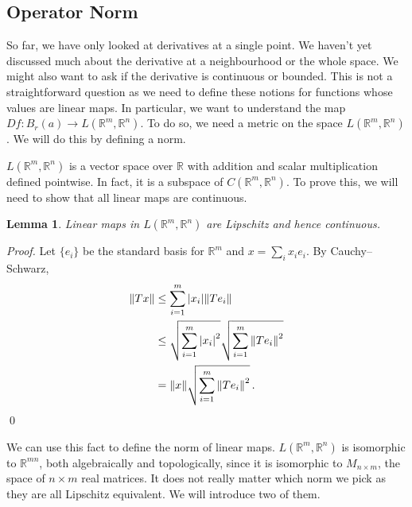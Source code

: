 \documentclass{article}
\theoremstyle{plain}\theoremheaderfont{\normalfont\itshape}\theorembodyfont{\rmfamily}\theoremseparator{.}\newtheorem*{rem}{Remark}\newtheorem*{ex}{Example}\newtheorem*{proof}{Proof}\newtheorem*{altp}{Alternative proof}
\theoremstyle{plain}\theoremheaderfont{\normalfont\bfseries}\theorembodyfont{\rmfamily}\theoremseparator{.}\newtheorem{thm}{Theorem}[section]\newtheorem{lem}[thm]{Lemma}\newtheorem{prop}[thm]{Proposition}\newtheorem*{cor}{Corollary}\newtheorem{defn}[thm]{Definition}\newtheorem{clm}[thm]{Claim}\newtheorem{clminproof}{Claim}
\theoremstyle{break}\theoremheaderfont{\normalfont\itshape}\theorembodyfont{\rmfamily}\theoremseparator{.\medskip}\newtheorem*{proofskip}{Proof}\newtheorem*{exs}{Examples}\newtheorem*{rems}{Remarks}
\theoremstyle{break}\theoremheaderfont{\normalfont\bfseries}\theorembodyfont{\rmfamily}\theoremseparator{.\medskip}\newtheorem{lemskip}[thm]{Lemma}\newtheorem{defnskip}[thm]{Definition}\newtheorem{propskip}[thm]{Proposition}\newtheorem{thmskip}[thm]{Theorem}
\newcommand{\qed}{\hfill\ensuremath{\Box}}
\begin{document}
    \subsection{Operator Norm}
    So far, we have only looked at derivatives at a single point. We haven't yet discussed much about the derivative at a neighbourhood or the whole space. We might also want to ask if the derivative is continuous or bounded. This is not a straightforward question as we need to define these notions for functions whose values are linear maps. In particular, we want to understand the map \(Df:B_r(a)\to L(\mathbb{R}^m,\mathbb{R}^n)\). To do so, we need a metric on the space \(L(\mathbb{R}^m,\mathbb{R}^n)\). We will do this by defining a norm.

    \(L(\mathbb{R}^m,\mathbb{R}^n)\) is a vector space over \(\mathbb{R}\) with addition and scalar multiplication defined pointwise. In fact, it is a subspace of \(C(\mathbb{R}^m,\mathbb{R}^n)\). To prove this, we will need to show that all linear maps are continuous.
    \begin{lem}
        Linear maps in \(L(\mathbb{R}^m,\mathbb{R}^n)\) are Lipschitz and hence continuous.
    \end{lem}
    \begin{proof}
        Let \(\{e_i\}\) be the standard basis for \(\mathbb{R}^m\) and \(x=\sum_i x_i e_i\). By Cauchy--Schwarz,
        \begin{align*}
            \norm{Tx}&\le\sum_{i=1}^{m}\abs{x_i}\norm{Te_i}\\
            &\le\sqrt{\sum_{i=1}^{m}\abs{x_i}^2}\sqrt{\sum_{i=1}^{m}\norm{Te_i}^2}\\
            &=\norm{x}\sqrt{\sum_{i=1}^{m}\norm{Te_i}^2}\,.
        \end{align*}\qed
    \end{proof}

    We can use this fact to define the norm of linear maps. \(L(\mathbb{R}^m,\mathbb{R}^n)\) is isomorphic to \(\mathbb{R}^{mn}\), both algebraically and topologically, since it is isomorphic to \(M_{n\times m}\), the space of \(n\times m\) real matrices. It does not really matter which norm we pick as they are all Lipschitz equivalent. We will introduce two of them.
\end{document}
